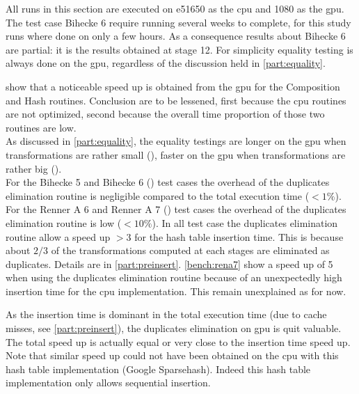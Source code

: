 {All runs in this section are executed on \gls{e51650} as the \gls{cpu} and \gls{1080} as the \gls{gpu}.
The test case Bihecke 6 require running several weeks to complete, for this study runs where done on only a few hours.
As a consequence results about Bihecke 6 are partial: it is the results obtained at stage 12.
For simplicity equality testing is always done on the \gls{gpu}, regardless of the discussion held in \autoref{part:equality}.



 show that a noticeable speed up is obtained from the \gls{gpu} for the Composition and Hash routines. Conclusion are to be lessened, first because the \gls{cpu} routines are not optimized, second because the overall time proportion of those two routines are low.\\
As discussed in \autoref{part:equality}, the equality testings are longer on the \gls{gpu} when transformations are rather small (), faster on the \gls{gpu} when transformations are rather big ().\\
For the Bihecke 5 and Bihecke 6 () test cases the overhead of the duplicates elimination routine is negligible compared to the total execution time ($<1\%$).\\
For the Renner A 6 and Renner A 7 () test cases the overhead of the duplicates elimination routine is low ($<10\%$).
In all test case the duplicates elimination routine allow a speed up $>3$ for the hash table insertion time. This is because about $2/3$ of the transformations computed at each stages are eliminated as duplicates. Details are in \autoref{part:preinsert}. 
\autoref{bench:rena7} show a speed up of 5 when using the duplicates elimination routine because of an unexpectedly high insertion time for the \gls{cpu} implementation. This remain unexplained as for now.

As the insertion time is dominant in the total execution time (due to cache misses, see \autoref{part:preinsert}), the duplicates elimination on \gls{gpu} is quit valuable. The total speed up is actually equal or very close to the insertion time speed up. Note that similar speed up could not have been obtained on the \gls{cpu} with this hash table implementation (Google Sparsehash). Indeed this hash table implementation only allows sequential insertion.



}
